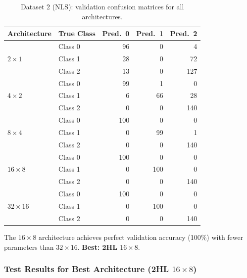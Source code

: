 \documentclass[11pt,a4paper]{article}
\begin{document}
\begin{table}[H]
\centering
\caption{Dataset 2 (NLS): validation confusion matrices for all architectures.}
\small
\begin{tabular}{llrrr}
\toprule
Architecture & True Class & Pred.\ 0 & Pred.\ 1 & Pred.\ 2 \\
\midrule
\multirow{3}{*}{$2\times1$}   & Class 0 & 96  & 0   & 4   \\
                               & Class 1 & 28  & 0   & 72  \\
                               & Class 2 & 13  & 0   & 127 \\
\midrule
\multirow{3}{*}{$4\times2$}   & Class 0 & 99  & 1   & 0   \\
                               & Class 1 & 6   & 66  & 28  \\
                               & Class 2 & 0   & 0   & 140 \\
\midrule
\multirow{3}{*}{$8\times4$}   & Class 0 & 100 & 0   & 0   \\
                               & Class 1 & 0   & 99  & 1   \\
                               & Class 2 & 0   & 0   & 140 \\
\midrule
\multirow{3}{*}{$16\times8$}  & Class 0 & 100 & 0   & 0   \\
                               & Class 1 & 0   & 100 & 0   \\
                               & Class 2 & 0   & 0   & 140 \\
\midrule
\multirow{3}{*}{$32\times16$} & Class 0 & 100 & 0   & 0   \\
                               & Class 1 & 0   & 100 & 0   \\
                               & Class 2 & 0   & 0   & 140 \\
\bottomrule
\end{tabular}
\end{table}

The $16\times8$ architecture achieves perfect validation accuracy (100\%) with fewer parameters than $32\times16$. \textbf{Best: 2HL $16\times8$}.

\subsubsection*{Test Results for Best Architecture (2HL $16\times8$)}
\end{document}

